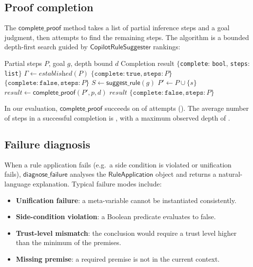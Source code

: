 \documentclass[11pt]{article}
\newcommand{\CRS}{\ensuremath{\mathsf{CopilotRuleSuggester}}}
\newcommand{\suggestRule}{\ensuremath{\mathsf{suggest\_rule}}}
\newcommand{\completeProof}{\ensuremath{\mathsf{complete\_proof}}}
\newcommand{\diagnoseFailure}{\ensuremath{\mathsf{diagnose\_failure}}}
\begin{document}
\subsection{Proof completion}\label{ssec:complete}

The $\completeProof$ method takes a list of partial inference steps
and a goal judgment, then attempts to find the remaining steps.
The algorithm is a bounded depth-first search guided by $\CRS$
rankings:

\begin{algorithm}[t]
\caption{$\completeProof$: Copilot-assisted proof completion.}
\label{alg:complete}
\begin{algorithmic}[1]
  \REQUIRE Partial steps $P$, goal $g$, depth bound $d$
  \ENSURE Completion result $\{$\texttt{complete}: \texttt{bool},
    \texttt{steps}: \texttt{list}$\}$
  \STATE $\Gamma \gets \textit{established}(P)$
    \RETURN $\{\texttt{complete}: \texttt{true},
      \texttt{steps}: P\}$
  \ENDIF
    \RETURN $\{\texttt{complete}: \texttt{false},
      \texttt{steps}: P\}$
  \ENDIF
  \STATE $S \gets \suggestRule(g)$
    \STATE $P' \gets P \cup \{s\}$
      \STATE $\mathit{result} \gets
        \completeProof(P', p, d)$
        \RETURN $\mathit{result}$
      \ENDIF
    \ENDFOR
  \ENDFOR
  \RETURN $\{\texttt{complete}: \texttt{false},
    \texttt{steps}: P\}$
\end{algorithmic}
\end{algorithm}

In our evaluation, $\completeProof$ succeeds on
\ppLXXXVIIproofCompletionsSucceeded{} of
\ppLXXXVIIproofCompletionsAttempted{} attempts
(\ppLXXXVIIproofCompletionRate).  The average number of steps in a
successful completion is \ppLXXXVIIavgProofSteps{}, with a maximum
observed depth of \ppLXXXVIImaxProofDepth.

\subsection{Failure diagnosis}\label{ssec:diagnose}

When a rule application fails (e.g.\ a side condition is violated
or unification fails), $\diagnoseFailure$ analyses the
$\mathsf{RuleApplication}$ object and returns a natural-language
explanation.  Typical failure modes include:
\begin{itemize}
  \item \textbf{Unification failure}: a meta-variable cannot be
    instantiated consistently.
  \item \textbf{Side-condition violation}: a Boolean predicate
    evaluates to false.
  \item \textbf{Trust-level mismatch}: the conclusion would require
    a trust level higher than the minimum of the premises.
  \item \textbf{Missing premise}: a required premise is not in the
    current context.
\end{itemize}
\end{document}
